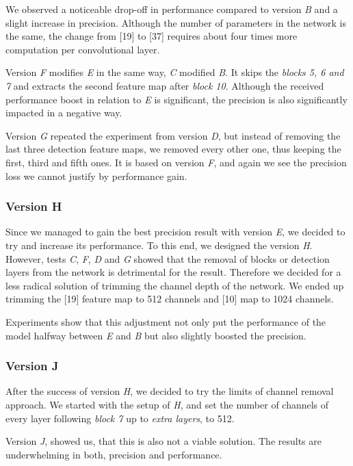 We observed a noticeable drop-off in performance compared to version \textit{B} and a slight increase in precision. Although the number of parameters in the network is the same, the change from [19] to [37] requires about four times more computation per convolutional layer.

Version \textit{F} modifies \textit{E} in the same way, \textit{C} modified \textit{B}. It skips the \textit{blocks 5, 6 and 7} and extracts the second feature map after \textit{block 10}. Although the received performance boost in relation to \textit{E} is significant, the precision is also significantly impacted in a negative way.

Version \textit{G} repeated the experiment from version \textit{D}, but instead of removing the last three detection feature maps, we removed every other one, thus keeping the first, third and fifth ones. It is based on version \textit{F}, and again we see the precision loss we cannot justify by performance gain.

\subsubsection{Version H}
Since we managed to gain the best precision result with version \textit{E}, we decided to try and increase its performance. To this end, we designed the version \textit{H}. However, tests \textit{C}, \textit{F}, \textit{D} and \textit{G} showed that the removal of blocks or detection layers from the network is detrimental for the result. Therefore we decided for a less radical solution of trimming the channel depth of the network. We ended up trimming the [19] feature map to 512 channels and [10] map to 1024 channels.

Experiments show that this adjustment not only put the performance of the model halfway between \textit{E} and \textit{B} but also slightly boosted the precision.

\subsubsection{Version J}
After the success of version \textit{H}, we decided to try the limits of channel removal approach. We started with the setup of \textit{H}, and set the number of channels of every layer following \textit{block 7} up to \textit{extra layers}, to 512. 

Version \textit{J}, showed us, that this is also not a viable solution. The results are underwhelming in both, precision and performance.


